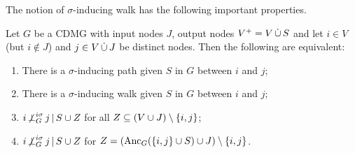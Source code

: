 The notion of $\sigma$-inducing walk has the following important properties.
\begin{Prp}\label{prp:sigma-inducing_path_properties}
  Let $G$ be a CDMG with input nodes $J$, output nodes $V^+ = V \,\dot{\cup}\, S$ and let $i \in V$ (but $i \notin J$) and $j \in V \,\dot{\cup}\, J$ be distinct nodes. 
  Then the following are equivalent:
  \begin{enumerate}[label=(\roman*)]
    \item There is a $\sigma$-inducing path given $S$ in $G$ between $i$ and $j$;\label{prp:sigma-inducing_path_properties2:i}
    \item There is a $\sigma$-inducing walk given $S$ in $G$ between $i$ and $j$;\label{prp:sigma-inducing_path_properties2:ii}
    \item $i \operatorname*{\not\perp}^{i\sigma}_G j \operatorname*{|} S \cup Z$ for all $Z \subseteq (V \cup J) \setminus \{i,j\}$;\label{prp:sigma-inducing_path_properties2:iii}
    \item $i \operatorname*{\not\perp}^{i\sigma}_G j \operatorname*{|} S \cup Z$ for $Z = (\mathrm{Anc}_G(\{i,j\} \cup S) \cup J) \setminus \{i,j\}$.\label{prp:sigma-inducing_path_properties2:iv}
  \end{enumerate}
\end{Prp}
